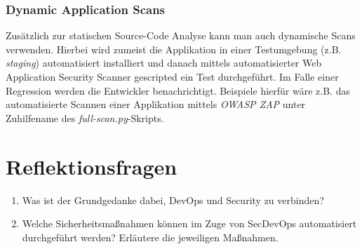 \subsubsection{Dynamic Application Scans}

Zusätzlich zur statischen Source-Code Analyse kann man auch dynamische Scans verwenden. Hierbei wird zumeist die Applikation in einer Testumgebung (z.B. \textit{staging}) automatisiert installiert und danach mittels automatisierter Web Application Security Scanner gescripted ein Test durchgeführt. Im Falle einer Regression werden die Entwickler benachrichtigt. Beispiele hierfür wäre z.B. das automatisierte Scannen einer Applikation mittels \textit{OWASP ZAP} unter Zuhilfename des \textit{full-scan.py}-Skripts.

\section{Reflektionsfragen}

\begin{enumerate}
	\item Was ist der Grundgedanke dabei, DevOps und Security zu verbinden?
	\item Welche Sicherheitsmaßnahmen können im Zuge von SecDevOps automatisiert durchgeführt werden? Erläutere die jeweiligen Maßnahmen.
\end{enumerate}
